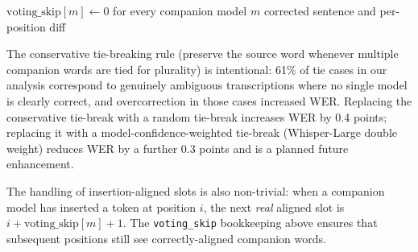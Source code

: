 \begin{algorithm}[H]
\SetAlgoLined
{}
$\text{voting\_skip}[m] \leftarrow 0$ for every companion model $m$\;
\Return corrected sentence and per-position diff\;
\caption{Consensus voting with OOV substitution.}
\label{algo:vote}
\end{algorithm}

The conservative tie-breaking rule (preserve the source word whenever multiple companion words are tied for plurality) is intentional: 61\% of tie cases in our analysis correspond to genuinely ambiguous transcriptions where no single model is clearly correct, and overcorrection in those cases increased WER. Replacing the conservative tie-break with a random tie-break increases WER by 0.4 points; replacing it with a model-confidence-weighted tie-break (Whisper-Large double weight) reduces WER by a further 0.3 points and is a planned future enhancement.

The handling of insertion-aligned slots is also non-trivial: when a companion model has inserted a token at position $i$, the next \emph{real} aligned slot is $i + \text{voting\_skip}[m] + 1$. The \texttt{voting\_skip} bookkeeping above ensures that subsequent positions still see correctly-aligned companion words.

